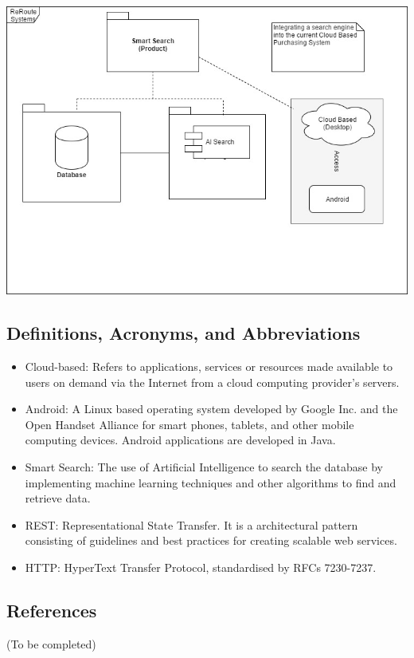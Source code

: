\documentclass[a4paper,10pt]{article}
\begin{document}
	\includegraphics[scale=0.62]{scope1.jpg}
	\subsection{Definitions, Acronyms, and Abbreviations} 

	\begin{itemize} 
	\item Cloud-based: Refers to applications, services or resources made available to users on demand via the Internet from a cloud computing provider's servers.
	\item Android: A Linux based operating system developed by Google Inc. and the Open Handset Alliance for smart phones, tablets, and other mobile computing devices. Android applications are developed in Java.
	\item Smart Search: The use of Artificial Intelligence to search the database by implementing machine learning techniques and other algorithms to find and retrieve data.
	\item REST: Representational State Transfer. It is a architectural pattern consisting of guidelines and best practices
for creating scalable web services.
	\item HTTP: HyperText Transfer Protocol, standardised by RFCs 7230-7237.
	\end{itemize}
	
	\subsection{References} 
	(To be completed)
	
\end{document}
